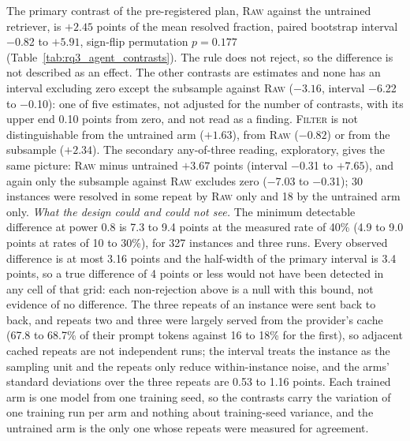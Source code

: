 \documentclass[10pt,twocolumn]{article}
\begin{document}
The primary contrast of the pre-registered plan, \textsc{Raw} against the untrained retriever, is $+2.45$ points of the mean resolved fraction, paired bootstrap interval $-$0.82 to $+5.91$, sign-flip permutation $p=0.177$ (Table~\ref{tab:rq3_agent_contrasts}). %
The rule does not reject, so the difference is not described as an effect. The other contrasts are estimates and none has an interval excluding zero except the subsample against \textsc{Raw} ($-3.16$, interval $-$6.22 to $-$0.10): one of five estimates, not adjusted for the number of contrasts, with its upper end 0.10 points from zero, and not read as a finding. %
\textsc{Filter} is not distinguishable from the untrained arm ($+1.63$), from \textsc{Raw} ($-0.82$) or from the subsample ($+2.34$). %
The secondary any-of-three reading, exploratory, gives the same picture: \textsc{Raw} minus untrained $+3.67$ points (interval $-$0.31 to $+7.65$), and again only the subsample against \textsc{Raw} excludes zero ($-$7.03 to $-$0.31); 30 instances were resolved in some repeat by \textsc{Raw} only and 18 by the untrained arm only. %
\emph{What the design could and could not see.} The minimum detectable difference at power 0.8 is 7.3 to 9.4 points at the measured rate of 40\% (4.9 to 9.0 points at rates of 10 to 30\%), for 327 instances and three runs. %
Every observed difference is at most 3.16 points and the half-width of the primary interval is 3.4 points, so a true difference of 4 points or less would not have been detected in any cell of that grid: each non-rejection above is a null with this bound, not evidence of no difference. %
The three repeats of an instance were sent back to back, and repeats two and three were largely served from the provider's cache (67.8 to 68.7\% of their prompt tokens against 16 to 18\% for the first), so adjacent cached repeats are not independent runs; the interval treats the instance as the sampling unit and the repeats only reduce within-instance noise, and the arms' standard deviations over the three repeats are 0.53 to 1.16 points. %
Each trained arm is one model from one training seed, so the contrasts carry the variation of one training run per arm and nothing about training-seed variance, and the untrained arm is the only one whose repeats were measured for agreement.
\end{document}
